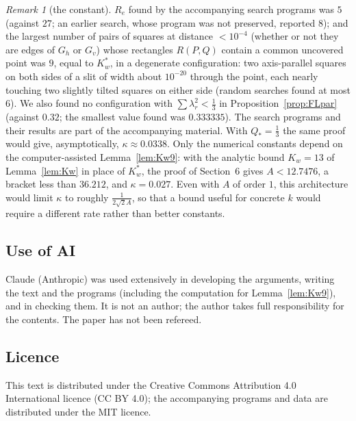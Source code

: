 \documentclass[11pt]{amsart}
\theoremstyle{definition}
\theoremstyle{remark}
\newtheorem{remark}[theorem]{Remark}
\begin{document}
\begin{remark}[the constant]
$R_e$ found by the accompanying search programs was $5$ (against $27$; an earlier search, whose program was not preserved,
reported $8$); and the largest number of pairs of squares at distance $<10^{-4}$ (whether or not they
are edges of $G_h$ or $G_v$) whose rectangles $R(P,Q)$ contain a common uncovered point was $9$, equal to $K_w^*$, in a degenerate
configuration: two axis-parallel squares on both sides of a slit of width about $10^{-20}$ through the point, each nearly touching
two slightly tilted squares on either side (random searches found at most $6$). We also found no configuration with $\sum\lambda_r^2<\frac13$ in Proposition~\ref{prop:FLpar}
(against $0.32$; the smallest value found was $0.333335$). The search programs and their results are part of the accompanying material. With $Q_*=\frac13$ the same proof would give,
asymptotically, $\kappa\approx0.0338$.
Only the numerical constants depend on the computer-assisted Lemma~\ref{lem:Kw9}: with the analytic bound $K_w=13$ of
Lemma~\ref{lem:Kw} in place of $K_w^*$, the proof of Section~6 gives $A<12.7476$, a bracket less than $36.212$, and $\kappa=0.027$. Even with $A$ of order $1$, this
architecture would limit $\kappa$ to roughly $\frac1{2\sqrt2A}$, so that a bound useful for concrete $k$ would require a different
rate rather than better constants.
\end{remark}

\subsection*{Use of AI}
Claude (Anthropic) was used extensively in developing the arguments, writing the text and the programs (including the
computation for Lemma~\ref{lem:Kw9}), and in checking them. It is not an author; the author takes full responsibility for the
contents. The paper has not been refereed.

\subsection*{Licence}
This text is distributed under the Creative Commons Attribution 4.0 International licence (CC BY 4.0); the accompanying programs and data are
distributed under the MIT licence.
\end{document}
